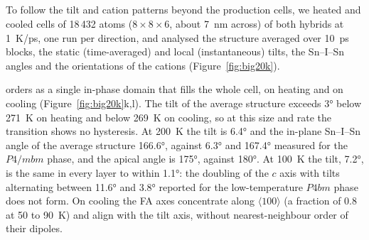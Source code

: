 \subsection{\protect{}}
\label{sec:res-big}
{\changedcolor
To follow the tilt and cation patterns beyond the production cells, we heated and cooled cells of
18\,432 atoms ($8\times8\times6$, about \SI{7}{nm} across) of both hybrids at \SI{1}{K/ps}, one run per
direction, and analysed the structure averaged over \SI{10}{ps} blocks, the static (time-averaged) and
local (instantaneous) tilts, the Sn--I--Sn angles and the orientations of the cations
(Figure~\ref{fig:big20k}).

\FASnI{} orders as a single in-phase domain that fills the whole cell, on heating and on cooling
(Figure~\ref{fig:big20k}k,l). The tilt of the average structure exceeds \ang{3} below \SI{271}{K} on
heating and below \SI{269}{K} on cooling, so at this size and rate the transition shows no hysteresis. At
\SI{200}{K} the tilt is \ang{6.4} and the in-plane Sn--I--Sn angle of the average structure
\ang{166.6}, against \ang{6.3} and \ang{167.4} measured for the $P4/mbm$ phase,\cite{Kahmann2020ACSEL}
and the apical angle is \ang{175}, against \ang{180}. At \SI{100}{K} the tilt, \ang{7.2}, is the same
in every layer to within \ang{1.1}: the doubling of the $c$ axis with tilts alternating between
\ang{11.6} and \ang{3.8} reported for the low-temperature $P4bm$ phase\cite{Kahmann2020ACSEL} does not
form. On cooling the FA axes concentrate along $\langle100\rangle$ (a fraction of 0.8 at 50 to
\SI{90}{K}) and align with the tilt axis, without nearest-neighbour order of their dipoles.

}
